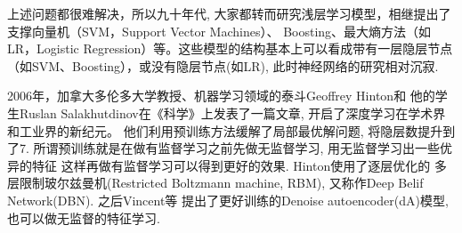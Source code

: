 \documentclass{ctexart}
\begin{document}
上述问题都很难解决，所以九十年代, 大家都转而研究浅层学习模型，相继提出了支撑向量机（SVM，Support
Vector Machines）、 Boosting、最大熵方法（如LR，Logistic
Regression）等。这些模型的结构基本上可以看成带有一层隐层节点（如SVM、Boosting），或没有隐层节点(如LR),
此时神经网络的研究相对沉寂.

2006年，加拿大多伦多大学教授、机器学习领域的泰斗Geoffrey Hinton和
他的学生Ruslan Salakhutdinov在《科学》上发表了一篇文章\cite{hinton2006reducing},
开启了深度学习在学术界和工业界的新纪元。
他们利用预训练方法缓解了局部最优解问题, 将隐层数提升到了7.
所谓预训练就是在做有监督学习之前先做无监督学习, 用无监督学习出一些优异的特征
这样再做有监督学习可以得到更好的效果. Hinton使用了逐层优化的
多层限制玻尔兹曼机(Restricted Boltzmann machine, RBM),
又称作Deep Belif Network(DBN). 之后Vincent等\cite{vincent2008extracting}
提出了更好训练的Denoise autoencoder(dA)模型, 也可以做无监督的特征学习.

\section{}



\end{document}
